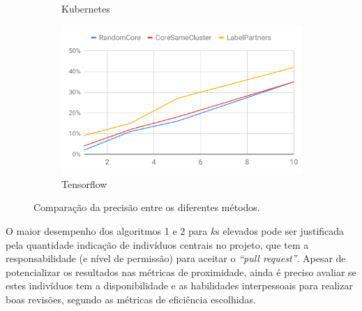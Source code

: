 \documentclass[12pt,openany,oneside,a4paper,english,brazil]{abntbibufjf}
\begin{document}
\begin{figure}[htbp]
\begin{subfigure}[b]{0.475\textwidth}
         \caption[Kubernetes]%
         {{\small Kubernetes}}
         \label{fig:perf-precision-kubernetes}
     \end{subfigure}
     \quad
     \begin{subfigure}[b]{0.475\textwidth}
         \centering
         \includegraphics[width=\textwidth]{resultados/perf-precision-tensorflow}
         \caption[Tensorflow]%
         {{\small Tensorflow}}
         \label{fig:perf-precision-tensorflow}
     \end{subfigure}
     \caption[]
     {\small Comparação da precisão entre os diferentes métodos.}
     \label{fig:perf-precision}
 \end{figure}

O maior desempenho dos algoritmos 1 e 2 para $k$s elevados pode ser justificada pela quantidade indicação de indivíduos centrais no projeto, que tem a responsabilidade (e nível de permissão) para aceitar o \textit{``pull request''}. Apesar de potencializar os resultados nas métricas de proximidade, ainda é preciso avaliar se estes indivíduos tem a disponibilidade e as habilidades interpessoais para realizar boas revisões, segundo as métricas de eficiência escolhidas.
\end{document}
